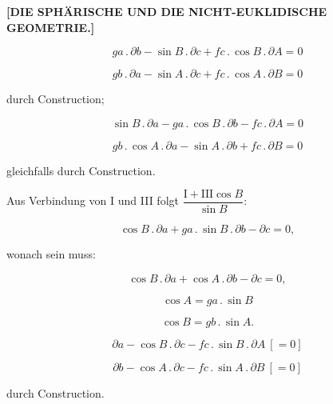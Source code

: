 \clearpage
{}%
\begin{center}
\textbf{[DIE SPH\"ARISCHE UND DIE NICHT-EUKLIDISCHE GEOMETRIE.]}

\smallskip

\end{center}

\[
\tag*{I.} ga\,.\,\partial b - \sin B\,.\,\partial c + fc\,.\,\cos B\,.\,\partial A = 0
\]

\[
\tag*{II.} gb\,.\,\partial a - \sin A\,.\,\partial c + fc\,.\,\cos A\,.\,\partial B = 0
\]

\noindent durch Construction;

\[
\tag*{III.} \sin B\,.\,\partial a - ga\,.\,\cos B\,.\,\partial b - fc\,.\,\partial A = 0
\]

\[
\tag*{IV.} gb\,.\,\cos A\,.\,\partial a - \sin A\,.\,\partial b + fc\,.\,\partial B = 0
\]

\noindent gleichfalls durch Construction.

\begin{center}\end{center}

\noindent Aus Verbindung von I und III folgt $\dfrac{\text{I}+\text{III}\cos B}{\sin B}$:

\[
\cos B\,.\,\partial a + ga\,.\,\sin B\,.\,\partial b - \partial c = 0,
\]

\noindent wonach sein muss:

\[
\tag*{V.} \cos B\,.\,\partial a + \cos A\,.\,\partial b - \partial c = 0,
\]

\[
\tag*{1)} \cos A = ga\,.\,\sin B
\]

\[
\tag*{2)} \cos B = gb\,.\,\sin A.
\]

\[
\tag*{VI.} \partial a - \cos B\,.\,\partial c - fc\,.\,\sin B\,.\,\partial A\ [= 0]
\]

\[
\tag*{VII.} \partial b - \cos A\,.\,\partial c - fc\,.\,\sin A\,.\,\partial B\ [= 0]
\]

\noindent durch Construction.

